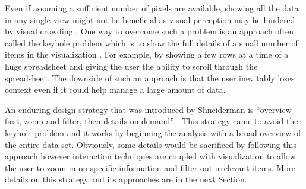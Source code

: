 Even if assuming a sufficient number of pixels are available, showing all the data in any single view might not be beneficial as visual perception may be hindered by visual crowding \cite{wolfe2015sensation}. One way to overcome such a problem is an approach often called the keyhole problem which is to show the full details of a small number of items in the visualization \cite{salvendy2012handbook}. For example, by showing a few rows at a time of a huge spreadsheet and giving the user the ability to scroll through the spreadsheet. The downside of such an approach is that the user inevitably loses context even if it could help manage a large amount of data.


 An enduring design strategy that was introduced by Shneiderman is “overview first, zoom and filter, then details on demand” \cite{shneiderman2003eyes}. This strategy came to avoid the keyhole problem and it works by beginning the analysis with a broad overview of the entire data set. Obviously, some details would be sacrificed by following this approach however interaction techniques are coupled with visualization to allow the user to zoom in on specific information and filter out irrelevant items. More details on this strategy and its approaches are in the next Section.

